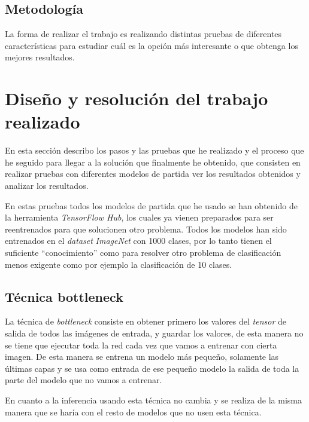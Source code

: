 \documentclass[12pt,a4paper]{article}
\begin{document}
\subsection{Metodología}
La forma de realizar el trabajo es realizando distintas pruebas de diferentes características para estudiar cuál es la opción más interesante o que obtenga los mejores resultados.

\newpage
\section{Diseño y resolución del trabajo realizado}
En esta sección describo los pasos y las pruebas que he realizado y el proceso que he seguido para llegar a la solución que finalmente he obtenido, que consisten en realizar pruebas con diferentes modelos de partida ver los resultados obtenidos y analizar los resultados.
\bigskip

En estas pruebas todos los modelos de partida que he usado se han obtenido de la herramienta \textit{TensorFlow Hub}, los cuales ya vienen preparados para ser reentrenados para que solucionen otro problema. Todos los modelos han sido entrenados en el \textit{dataset} \textit{ImageNet} con 1000 clases, por lo tanto tienen el suficiente ``conocimiento'' como para resolver otro problema de clasificación menos exigente como por ejemplo la clasificación de 10 clases.

\subsection{Técnica bottleneck}
La técnica de \textit{bottleneck} consiste en obtener primero los valores del \textit{tensor} de salida de todos las imágenes de entrada, y guardar los valores, de esta manera no se tiene que ejecutar toda la red cada vez que vamos a entrenar con cierta imagen. De esta manera se entrena un modelo más pequeño, solamente las últimas capas y se usa como entrada de ese pequeño modelo la salida de toda la parte del modelo que no vamos a entrenar.
\bigskip

En cuanto a la inferencia usando esta técnica no cambia y se realiza de la misma manera que se haría con el resto de modelos que no usen esta técnica.
\end{document}
